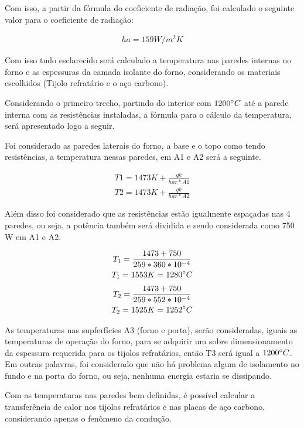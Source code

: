 Com isso, a partir da fórmula do coeficiente de radiação, foi calculado o seguinte valor para o coeficiente de radiação:

\begin{gather}
	ha = 159W/m^{2}K \nonumber
\end{gather}

Com isso tudo esclarecido será calculado a temperatura nas paredes internas no forno e as espessuras da camada isolante do forno, considerando os materiais escolhidos (Tijolo refratário e o aço carbono).

Considerando o primeiro trecho, partindo do interior com $1200 \degree C$ até a parede interna com as resistências instaladas, a fórmula para o cálculo da temperatura, será apresentado logo a seguir.

Foi considerado as paredes laterais do forno, a base e o topo como tendo resistências, a temperatura nessas paredes, em A1 e A2 será a seguinte.

\begin{gather}
	T1 = 1473K + \frac{qk}{har*A1} \nonumber \\
	T2 = 1473K + \frac{qk}{har*A2} \nonumber
\end{gather}

Além disso foi considerado que as resistências estão igualmente espaçadas nas 4 paredes, ou seja, a potência também será dividida e sendo considerada como 750 W em A1 e A2.

\begin{gather}
	T_1 = \frac{1473 + 750} {259*360*10^{-4}} \nonumber \\
	T_1 = 1553K = 1280 \degree C \nonumber
    \nonumber
\end{gather}
\begin{gather}
    T_2 = \frac{1473 + 750} {259   *552*10^{-4}} \nonumber \\
	T_2 = 1525K = 1252 \degree C \nonumber
\end{gather}

As temperaturas nas supferfícies A3 (forno e porta), serão consideradas, iguais as temperaturas de operação do forno, para se adquirir um sobre dimensionamento da espessura requerida para os tijolos refratários, então T3 será igual a $1200 \degree C$. Em outras palavras, foi considerado que não há problema algum de isolamento no fundo e na porta do forno, ou seja, nenhuma energia estaria se dissipando.

Com as temperaturas nas paredes bem definidas, é possível calcular a transferência de calor nos tijolos refratários e nas placas de aço carbono, considerando apenas o fenômeno da condução.

